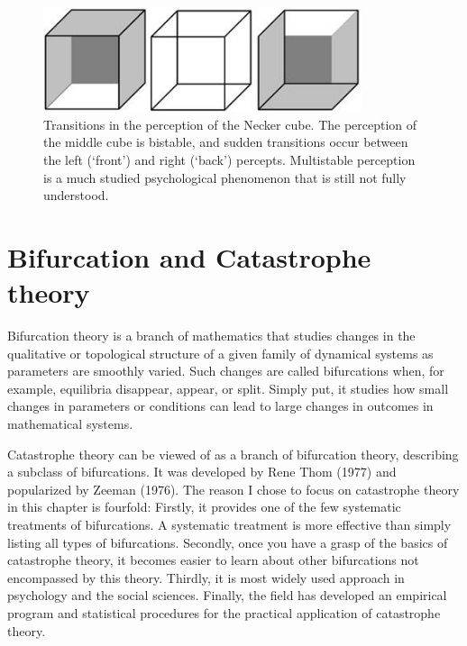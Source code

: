 \documentclass[
  letterpaper,
]{scrbook}
\begin{document}
\begin{figure}

{\centering \includegraphics[width=3.677in,height=1.21003in]{media/ch3/image2.jpg}

}

\caption{\label{fig-ch3-img2-old-14}Transitions in the perception of the
Necker cube. The perception of the middle cube is bistable, and sudden
transitions occur between the left (`front') and right (`back')
percepts. Multistable perception is a much studied psychological
phenomenon that is still not fully understood.}

\end{figure}

\hypertarget{bifurcation-and-catastrophe-theory}{%
\section{Bifurcation and Catastrophe
theory}\label{bifurcation-and-catastrophe-theory}}

Bifurcation theory is a branch of mathematics that studies changes in
the qualitative or topological structure of a given family of dynamical
systems as parameters are smoothly varied. Such changes are called
bifurcations when, for example, equilibria disappear, appear, or split.
Simply put, it studies how small changes in parameters or conditions can
lead to large changes in outcomes in mathematical systems.

Catastrophe theory can be viewed of as a branch of bifurcation theory,
describing a subclass of bifurcations. It was developed by Rene Thom
(1977) and popularized by Zeeman (1976). The reason I chose to focus on
catastrophe theory in this chapter is fourfold: Firstly, it provides one
of the few systematic treatments of bifurcations. A systematic treatment
is more effective than simply listing all types of bifurcations.
Secondly, once you have a grasp of the basics of catastrophe theory, it
becomes easier to learn about other bifurcations not encompassed by this
theory. Thirdly, it is most widely used approach in psychology and the
social sciences. Finally, the field has developed an empirical program
and statistical procedures for the practical application of catastrophe
theory.
\end{document}
